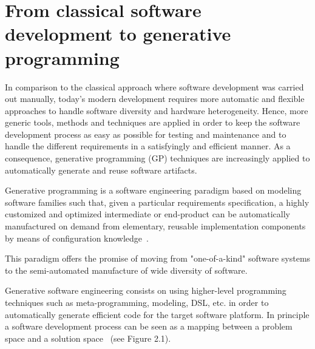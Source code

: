  










\section{From classical software development to generative programming}
\label{sec:FROM} 
In comparison to the classical approach where software development was carried out manually, today’s modern development requires more automatic and flexible approaches to handle software diversity and hardware heterogeneity.
Hence, more generic tools, methods and techniques are applied in order to keep the software development process as easy as possible for testing and maintenance and to handle the different requirements in a satisfyingly and efficient manner.
As a consequence, generative programming (GP) techniques are increasingly applied to automatically generate and reuse software artifacts.
\begin{mydef}
		Generative programming is a software engineering paradigm based on modeling software families such that, given a particular requirements specification, a highly customized and optimized intermediate or end-product can be automatically manufactured on demand from elementary, reusable implementation components by means of configuration knowledge~\cite{Czarnecki:2000:GPM:345203}.
\end{mydef}

This paradigm offers the promise of moving from "one-of-a-kind" software systems to the semi-automated manufacture of wide diversity of software.

Generative software engineering consists on using higher-level programming techniques such as meta-programming, modeling, DSL, etc. in order to automatically generate efficient code for the target software platform. 
In principle a software development process can be seen as a mapping between a problem space and a solution space~\cite{czarnecki2005overview} (see Figure 2.1). 

